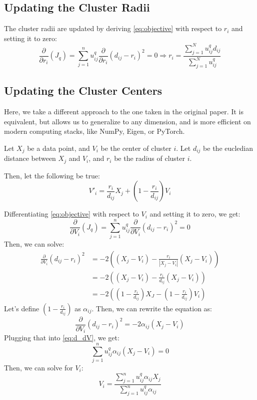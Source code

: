 \documentclass[conference]{IEEEtran}
\begin{document}
\subsection{Updating the Cluster Radii}
The cluster radii are updated by deriving \eqref{eq:objective} with respect to $r_i$ and setting it to zero:
\begin{equation}\label{eq:d_dr}
\frac{\partial}{\partial r_i}(J_q) = \sum_{j=1}^{n} u_{ij}^q\frac{\partial}{\partial r_i} (d_{ij} - r_i)^2 = 0
\Rightarrow r_i = \frac{\sum_{j=1}^{N} u_{ij}^q d_{ij}}{\sum_{j=1}^{N} u_{ij}^q}
\end{equation}

\subsection{Updating the Cluster Centers}
Here, we take a different approach to the one taken in the original paper.
It is equivalent, but allows us to generalize to any dimension, and is more efficient on modern computing stacks,
like NumPy, Eigen, or PyTorch.

Let $X_j$ be a data point, and $V_i$ be the center of cluster $i$. Let $d_{ij}$ be the eucledian distance between $X_j$ and $V_i$,
and $r_i$ be the radius of cluster $i$.

Then, let the following be true:
\begin{equation}
V'_i = \frac{r_i}{d_{ij}}X_j + (1 - \frac{r_i}{d_{ij}})V_i
\end{equation}

Differentiating \eqref{eq:objective} with respect to $V_i$ and setting it to zero, we get:
\begin{equation}\label{eq:d_dV}
\frac{\partial}{\partial V_i}(J_q) = \sum_{j=1}^{n} u_{ij}^q\frac{\partial}{\partial V_i} (d_{ij} - r_i)^2 = 0
\end{equation}
Then, we can solve:
\begin{equation}
\begin{aligned}
\frac{\partial}{\partial V_i} (d_{ij} - r_i)^2 &= -2 \left( (X_j - V_i) - \frac{r_i}{|X_j - V_i|} (X_j - V_i) \right) \\
&= -2 \left( (X_j - V_i) - \frac{r_i}{d_{ij}} (X_j - V_i) \right) \\
&= -2 \left( (1 - \frac{r_i}{d_{ij}})X_J - (1 - \frac{r_i}{d_{ij}})V_i \right)
\end{aligned}
\end{equation}
Let's define $(1 - \frac{r_i}{d_{ij}})$ as $\alpha_{ij}$.
Then, we can rewrite the equation as:
\begin{equation}
\frac{\partial}{\partial V_i} (d_{ij} - r_i)^2 = -2 \alpha_{ij} (X_j - V_i)
\end{equation}
Plugging that into \eqref{eq:d_dV}, we get:
\begin{equation}
\sum_{j=1}^{n} u_{ij}^q \alpha_{ij} (X_j - V_i) = 0
\end{equation}
Then, we can solve for $V_i$:
\begin{equation}
V_i = \frac{\sum_{j=1}^{n} u_{ij}^q \alpha_{ij} X_j}{\sum_{j=1}^{n} u_{ij}^q \alpha_{ij}}
\end{equation}
\end{document}
